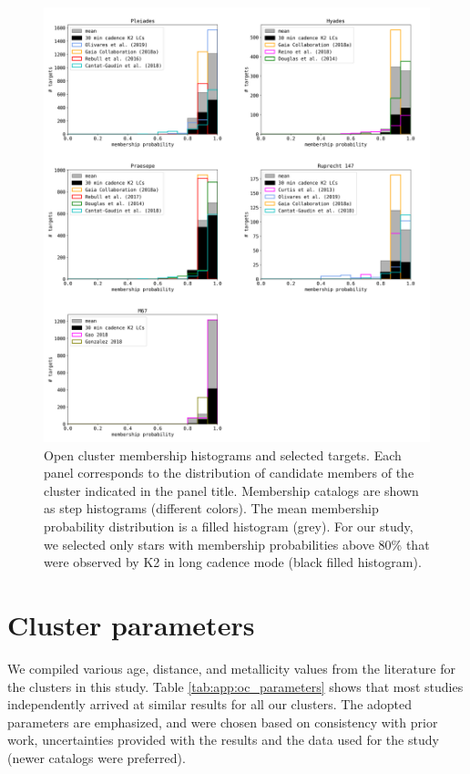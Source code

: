 \documentclass{aa}
\begin{document}
\begin{appendix}

   \begin{figure}[ht!]
            \includegraphics[width=\hsize]{pics/appendix/membership_histograms.png}
         \caption{Open cluster membership histograms and selected targets. Each panel corresponds to the distribution of candidate members of the cluster indicated in the panel title. Membership catalogs are shown as step histograms (different colors). The mean membership probability distribution is a filled histogram (grey). For our study, we selected only stars with membership probabilities above 80\% that were observed by K2 in long cadence mode (black filled histogram).}
          \label{fig:app:memberships}
   \end{figure}

\section{Cluster parameters}
\label{app:cluster_params}
We compiled various age, distance, and metallicity values from the literature for the clusters in this study. Table \ref{tab:app:oc_parameters} shows that most studies independently arrived at similar results for all our clusters. The adopted parameters are emphasized, and were chosen based on consistency with prior work, uncertainties provided with the results and the data used for the study (newer catalogs were preferred). 


\end{appendix}
\end{document}
